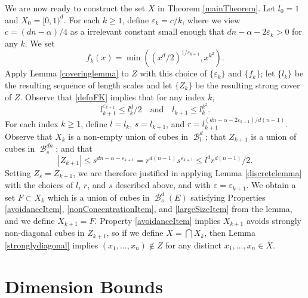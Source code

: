 \documentclass[dvipsnames,letterpaper,12pt]{article}
\numberwithin{equation}{section}
\theoremstyle{plain}
\DeclareMathOperator{\B}{\mathcal{B}}
\begin{document}
We are now ready to construct the set $X$ in Theorem \ref{mainTheorem}. Let $l_0 = 1$ and $X_0 = [0,1)^d$. For each $k \geq 1$, define $\varepsilon_k = c/k$, where we view $c = (dn - \alpha)/4$ as a irrelevant constant small enough that $dn - \alpha - 2\varepsilon_k > 0$ for any $k$. We set
%
\begin{equation}\label{defnFK}
	f_k(x) = \min \left( (x^d/2)^{1/\varepsilon_{k+1}}, x^{k^2} \right).
\end{equation}
%
Apply Lemma \ref{coveringlemma} to $Z$ with this choice of $\{\varepsilon_k\}$ and $\{f_k\}$; let $\{l_k\}$ be the resulting sequence of length scales and let $\{Z_k\}$ be the resulting strong cover of $Z$. Observe that \eqref{defnFK} implies that for any index $k$,
%
\begin{equation} \label{boundOnLk}
	l_{k+1}^{\varepsilon_{k+1}} \leq l_k^d/2 \quad \text{and} \quad l_{k+1} \leq l_k^{k^2}.
\end{equation}
%
For each index $k \geq 1$, define $l = l_k$, $s = l_{k+1}$, and $r = l_{k+1}^{(dn - \alpha - 2\varepsilon_{k+1})/d(n-1)}$. Observe that $X_k$ is a non-empty union of cubes in $\B^d_l$; that $Z_{k+1}$ is a union of cubes in $\B^{dn}_s$; and that
%
\[ |Z_{k+1}| \leq s^{dn - \alpha - \varepsilon_{k+1}} = r^{d(n-1)} s^{\varepsilon_{k+1}} \leq l^d r^{d(n-1)}/2. \]
%
Setting $Z_s = Z_{k+1}$, we are therefore justified in applying Lemma \ref{discretelemma} with the choices of $l$, $r$, and $s$ described above, and with $\varepsilon = \varepsilon_{k+1}$. We obtain a set $F \subset X_k$ which is a union of cubes in $\B^d_s(E)$ satisfying Properties \ref{avoidanceItem}, \ref{nonConcentrationItem}, and \ref{largeSizeItem} from the lemma, and we define $X_{k+1} = F$. Property \ref{avoidanceItem} implies $X_{k+1}$ avoids strongly non-diagonal cubes in $Z_{k+1}$, so if we define $X = \bigcap X_k$, then Lemma \ref{stronglydiagonal} implies $(x_1, \dots, x_n) \not \in Z$ for any distinct $x_1, \dots, x_n \in X$.









\section{Dimension Bounds}\label{dimensionsection}
\end{document}
